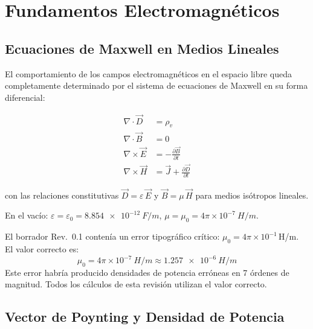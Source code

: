 \documentclass[12pt,a4paper]{article}
\begin{document}
\newpage

\section{Fundamentos Electromagnéticos}

\subsection{Ecuaciones de Maxwell en Medios Lineales}

El comportamiento de los campos electromagnéticos en el espacio libre
queda completamente determinado por el sistema de ecuaciones de Maxwell
en su forma diferencial:

\begin{align}
  \nabla \cdot \vec{D} &= \rho_v
    \label{eq:gauss_e}\tag{Ley de Gauss eléctrica}\\[4pt]
  \nabla \cdot \vec{B} &= 0
    \label{eq:gauss_m}\tag{Ley de Gauss magnética}\\[4pt]
  \nabla \times \vec{E} &= -\frac{\partial \vec{B}}{\partial t}
    \label{eq:faraday}\tag{Ley de Faraday}\\[4pt]
  \nabla \times \vec{H} &= \vec{J} + \frac{\partial \vec{D}}{\partial t}
    \label{eq:ampere}\tag{Ley de Ampère-Maxwell}
\end{align}

con las relaciones constitutivas $\vec{D} = \varepsilon\,\vec{E}$ y
$\vec{B} = \mu\,\vec{H}$ para medios isótropos lineales.

En el vacío: $\varepsilon = \varepsilon_0 = \SI{8.854e-12}{F/m}$,
$\mu = \mu_0 = 4\pi\times10^{-7}\ \si{H/m}$.

\begin{correccion}
  El borrador Rev.~0.1 contenía un error tipográfico crítico:
  $\mu_0 = 4\pi\times 10^{-1}$\,H/m. El valor correcto es:
  \[
    \mu_0 = 4\pi\times 10^{-7}\ \si{H/m} \approx \SI{1.257e-6}{H/m}
  \]
  Este error habría producido densidades de potencia erróneas en 7 órdenes
  de magnitud. Todos los cálculos de esta revisión utilizan el valor correcto.
\end{correccion}

\subsection{Vector de Poynting y Densidad de Potencia}
\end{document}
